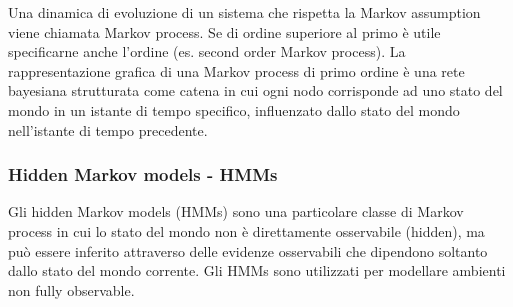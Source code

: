Una dinamica di evoluzione di un sistema che rispetta la Markov assumption viene chiamata Markov process. Se di ordine
superiore al primo è utile specificarne anche l'ordine (es. second order Markov process). La rappresentazione grafica
di una Markov process di primo ordine è una rete bayesiana strutturata come catena in cui ogni nodo corrisponde ad uno
stato del mondo in un istante di tempo specifico, influenzato dallo stato del mondo nell'istante di tempo precedente.

\begin{center}
\end{center}

\subsubsection*{Hidden Markov models - HMMs}
Gli hidden Markov models (HMMs) sono una particolare classe di Markov process in cui lo stato del mondo non è direttamente
osservabile (hidden), ma può essere inferito attraverso delle evidenze osservabili che dipendono soltanto dallo stato
del mondo corrente. Gli HMMs sono utilizzati per modellare ambienti non fully observable.

